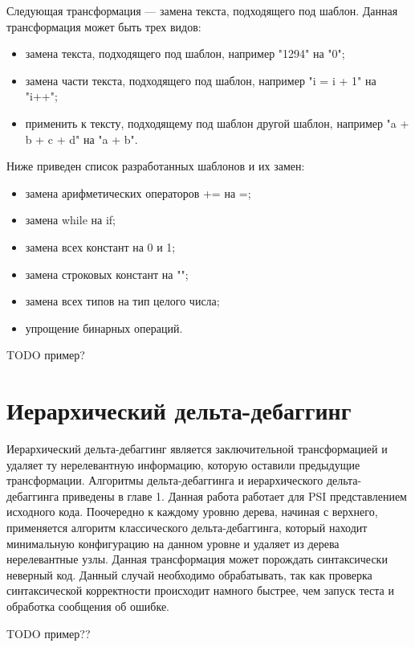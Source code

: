 Следующая трансформация --- замена текста, подходящего под шаблон. Данная трансформация может быть трех видов:
\begin{itemize}
	\item замена текста, подходящего под шаблон, например "1294" на "0"; 
	\item замена части текста, подходящего под шаблон, например "i = i + 1" на "i++";
	\item применить к тексту, подходящему под шаблон другой шаблон, например "a + b + c + d" на "a + b".
\end{itemize}
Ниже приведен список разработанных шаблонов и их замен:
\begin{itemize}
	\item замена арифметических операторов += на =;
	\item замена while на if;
	\item замена всех констант на 0 и 1;
	\item замена строковых констант на "";
	\item замена всех типов на тип целого числа;
	\item упрощение бинарных операций.
\end{itemize}
TODO пример?


\section{Иерархический дельта-дебаггинг}
Иерархический дельта-дебаггинг является заключительной трансформацией и удаляет ту нерелевантную информацию, которую оставили предыдущие трансформации. Алгоритмы дельта-дебаггинга и иерархического дельта-дебаггинга приведены в главе 1. Данная работа работает для PSI представлением исходного кода. Поочередно к каждому уровню дерева, начиная с верхнего, применяется алгоритм классического дельта-дебаггинга, который находит минимальную конфигурацию на данном уровне и удаляет из дерева нерелевантные узлы. Данная трансформация может порождать синтаксически неверный код. Данный случай необходимо обрабатывать, так как проверка синтаксической корректности происходит намного быстрее, чем запуск теста и обработка сообщения об ошибке.

TODO пример??

